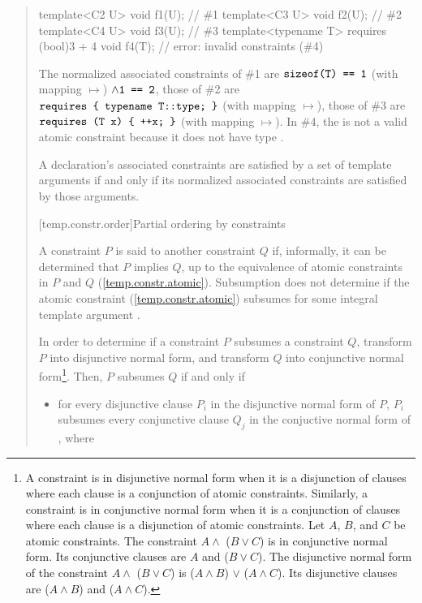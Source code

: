 \begin{quote}
\begin{addedblock}
\begin{codeblock}
template<C2 U> void f1(U);                            // \#1
template<C3 U> void f2(U);                            // \#2
template<C4 U> void f3(U);                            // \#3
template<typename T> requires (bool)3 + 4 void f4(T); // error: invalid constraints (\#4)
\end{codeblock}
The normalized associated constraints of \#1 are 
$\texttt{sizeof(T) == 1}$ (with mapping $\mapsto$) $\land \texttt{1 == 2}$,
% 
those of \#2 are
$\texttt{requires \{ typename T::type; \}}$ (with mapping $\mapsto$),
%
those of \#3 are
$\texttt{requires (T x) \{ ++x; \}}$ (with mapping $\mapsto$).
% 
In \#4, the  
is not a valid atomic constraint because it does not have type .
\exitexample


\pnum
A declaration's associated constraints are satisfied by a set of template
arguments if and only if its normalized associated constraints are satisfied
by those arguments.


[temp.constr.order]{Partial ordering by constraints}

\pnum
A constraint $P$ is said to  another constraint $Q$ 
if, informally, it can be determined that $P$ implies $Q$, up to 
the equivalence of atomic constraints in $P$ and $Q$
(\ref{temp.constr.atomic}).
% 
\enterexample
Subsumption does not determine if the atomic constraint 
 (\ref{temp.constr.atomic}) subsumes  for some 
integral template argument .
\exitexample

\pnum
In order to determine if a constraint $P$ subsumes a constraint
$Q$, transform $P$ into disjunctive normal form, 
and transform $Q$ into conjunctive normal form\footnote{
A constraint is in disjunctive normal form when it is a disjunction of
clauses where each clause is a conjunction of atomic constraints. 
% 
Similarly, a constraint is in conjunctive normal form when it is a conjunction 
of clauses where each clause is a disjunction of atomic constraints.
% 
\enterexample
Let $A$, $B$, and $C$ be atomic constraints.
% 
The constraint $A \land$ ($B \lor C$) is in 
conjunctive normal form.
% 
Its conjunctive clauses are $A$ and ($B \lor C$).
% 
The disjunctive normal form of the constraint
$A \land$ ($B \lor C$) 
is
($A \land B$) $\lor$ ($A \land C$).
% 
Its disjunctive clauses are ($A \land B$) and 
($A \land C$).
\exitexample
}.
% 
Then, $P$ subsumes $Q$ if and only if
\begin{itemize}
\item for every disjunctive clause $P_i$ in the disjunctive normal 
form of $P$, $P_i$ subsumes every conjunctive clause $Q_j$ 
in the conjuctive normal form of , where


\end{itemize}
\end{addedblock}
\end{quote}
